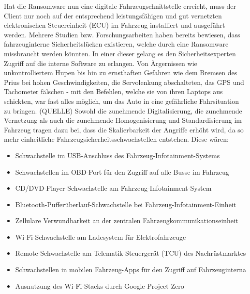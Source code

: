 Hat die Ransomware nun eine digitale Fahrzeugschnittstelle erreicht, muss der 
Client nur noch auf der entsprechend leistungsfähigen und gut vernetzten elektronischen 
Steuereinheit (ECU) im Fahrzeug installiert und ausgeführt werden.
\newline 
Mehrere Studien bzw. Forschungsarbeiten haben bereits bewiesen, dass fahrzeuginterne 
Sicherheitslücken existieren, welche durch eine Ransomware missbraucht werden könnten. 
In einer dieser gelang es den Sicherheitsexperten Zugriff auf die interne Software zu 
erlangen. Von Ärgernissen wie unkontrolliertem Hupen bis hin zu ernsthaften Gefahren 
wie dem Bremsen des Prius bei hohen Geschwindigkeiten, die Servolenkung abschalteten, 
das GPS und Tachometer fälschen -  mit den Befehlen, welche sie von ihren Laptops aus 
schickten, war fast alles möglich, um das Auto in eine gefährliche Fahrsituation zu 
bringen. (QUELLE)
\newline
Sowohl die zunehmende Digitalisierung, die zunehmende Vernetzung als auch die zunehmende 
Homogenisierung und Standardisierung im Fahrzeug tragen dazu bei, dass die Skalierbarkeit 
der Angriffe erhöht wird, da so mehr einheitliche Fahrzeugsicherheitsschwachstellen 
entstehen. Diese wären:

\begin{itemize}
    \item Schwachstelle im USB-Anschluss des Fahrzeug-Infotainment-Systems
    \item Schwachstellen im OBD-Port für den Zugriff auf alle Busse im Fahrzeug
    \item CD/DVD-Player-Schwachstelle am Fahrzeug-Infotainment-System
    \item Bluetooth-Pufferüberlauf-Schwachstelle bei Fahrzeug-Infotainment-Einheit
    \item Zellulare Verwundbarkeit an der zentralen Fahrzeugkommunikationseinheit
    \item Wi-Fi-Schwachstelle am Ladesystem für Elektrofahrzeuge
    \item Remote-Schwachstelle am Telematik-Steuergerät (TCU) des Nachrüstmarktes
    \item Schwachstellen in mobilen Fahrzeug-Apps für den Zugriff auf Fahrzeuginterna
    \item Ausnutzung des Wi-Fi-Stacks durch Google Project Zero
\end{itemize}
	
